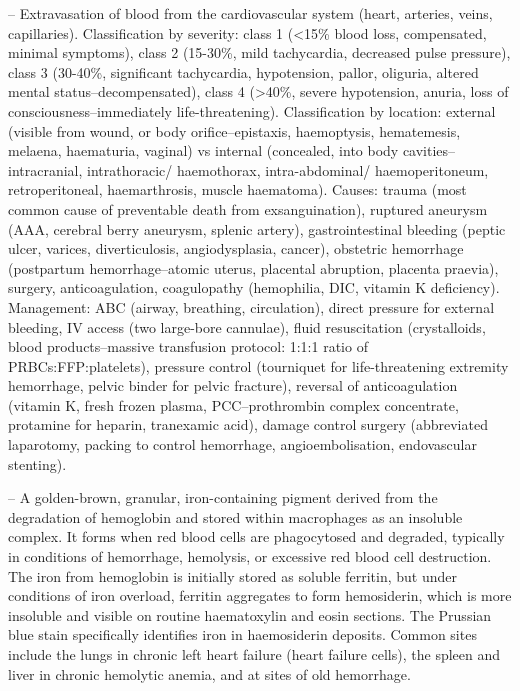 -- Extravasation of blood from the cardiovascular system (heart, arteries, veins, capillaries). Classification by severity: class 1 (<15\% blood loss, compensated, minimal symptoms), class 2 (15-30\%, mild tachycardia, decreased pulse pressure), class 3 (30-40\%, significant tachycardia, hypotension, pallor, oliguria, altered mental status--decompensated), class 4 (>40\%, severe hypotension, anuria, loss of consciousness--immediately life-threatening). Classification by location: external (visible from wound, or body orifice--epistaxis, haemoptysis, hematemesis, melaena, haematuria, vaginal) vs internal (concealed, into body cavities--intracranial, intrathoracic/ haemothorax, intra-abdominal/ haemoperitoneum, retroperitoneal, haemarthrosis, muscle haematoma). Causes: trauma (most common cause of preventable death from exsanguination), ruptured aneurysm (AAA, cerebral berry aneurysm, splenic artery), gastrointestinal bleeding (peptic ulcer, varices, diverticulosis, angiodysplasia, cancer), obstetric hemorrhage (postpartum hemorrhage--atomic uterus, placental abruption, placenta praevia), surgery, anticoagulation, coagulopathy (hemophilia, DIC, vitamin K deficiency). Management: ABC (airway, breathing, circulation), direct pressure for external bleeding, IV access (two large-bore cannulae), fluid resuscitation (crystalloids, blood products--massive transfusion protocol: 1:1:1 ratio of PRBCs:FFP:platelets), pressure control (tourniquet for life-threatening extremity hemorrhage, pelvic binder for pelvic fracture), reversal of anticoagulation (vitamin K, fresh frozen plasma, PCC--prothrombin complex concentrate, protamine for heparin, tranexamic acid), damage control surgery (abbreviated laparotomy, packing to control hemorrhage, angioembolisation, endovascular stenting).

-- A golden-brown, granular, iron-containing pigment derived from the degradation of hemoglobin and stored within macrophages as an insoluble complex. It forms when red blood cells are phagocytosed and degraded, typically in conditions of hemorrhage, hemolysis, or excessive red blood cell destruction. The iron from hemoglobin is initially stored as soluble ferritin, but under conditions of iron overload, ferritin aggregates to form hemosiderin, which is more insoluble and visible on routine haematoxylin and eosin sections. The Prussian blue stain specifically identifies iron in haemosiderin deposits. Common sites include the lungs in chronic left heart failure (heart failure cells), the spleen and liver in chronic hemolytic anemia, and at sites of old hemorrhage.

